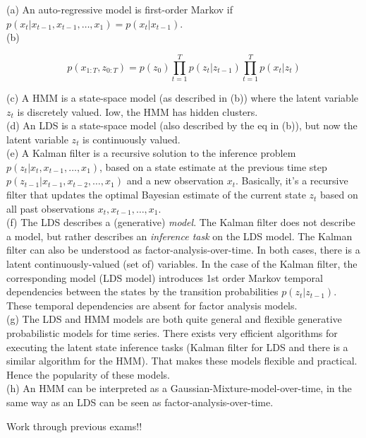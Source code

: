 \documentclass[a4paper]{article}
\begin{document}
\begin{ExerciseList}
\Answer[ref={ex:7}] 

(a) An auto-regressive model is first-order Markov if $p(x_t|x_{t-1},x_{t-1},\ldots,x_1) = p(x_t|x_{t-1})$. \\
(b) 

$$p(x_{1:T},z_{0:T}) = p(z_0)\prod_{t=1}^Tp(z_t|z_{t-1}) \prod_{t=1}^T p(x_t|z_t)$$ 

(c)  A HMM is a state-space model (as described in (b)) where the latent variable $z_t$ is discretely valued. Iow, the HMM has hidden clusters. \\
(d)  An LDS is a state-space model (also described by the eq in (b)), but now the latent variable $z_t$ is continuously valued.\\
(e) A Kalman filter is a recursive solution to the inference problem $p(z_t|x_t,x_{t-1},\dots,x_1)$, based on a state estimate at the previous time step $p(z_{t-1}|x_{t-1},x_{t-2},\dots,x_1)$  and a new observation $x_t$. Basically, it's a recursive filter that updates the optimal Bayesian estimate of the current state $z_t$ based on all past observations $x_t,x_{t-1},\dots,x_1$. \\
(f) The LDS describes a (generative) \emph{model}. The Kalman filter does not describe a model, but rather describes an \emph{inference task} on the LDS model. The Kalman filter can also be understood as factor-analysis-over-time. In both cases, there is a latent continuously-valued (set of) variables. In the case of the Kalman filter, the corresponding model (LDS model) introduces 1st order Markov temporal dependencies between the states by the transition probabilities $p(z_t|z_{t-1})$. These temporal dependencies are absent for factor analysis models. \\
(g) The LDS and HMM models are both quite general and flexible generative probabilistic models for time series. There exists very efficient algorithms for executing the latent state inference tasks (Kalman filter for LDS and there is a similar algorithm for the HMM). That makes these models flexible and practical. Hence the popularity of these models. \\
(h) An HMM can be interpreted as a Gaussian-Mixture-model-over-time, in the same way as an LDS can be seen as factor-analysis-over-time. 

\Exercise[label={final}] 
Work through previous exams!!


\end{ExerciseList}
\end{document}
